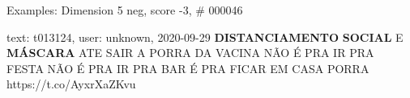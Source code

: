 \begin{frame}{Examples: Dimension 5 neg, score -3, \# 000046}
\footnotesize
\begin{alertblock}{text: t013124, user: unknown, 2020-09-29}
\textbf{DISTANCIAMENTO} \textbf{SOCIAL} E \textbf{MÁSCARA} ATE SAIR A PORRA DA 
VACINA NÃO É PRA IR PRA FESTA NÃO É PRA IR PRA BAR É PRA FICAR EM CASA PORRA 
https://t.co/AyxrXaZKvu 
\end{alertblock}
\end{frame}
